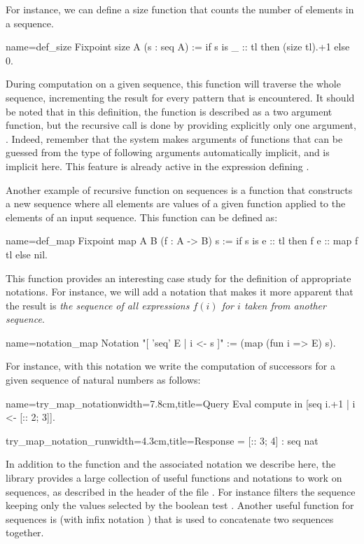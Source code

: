 For instance, we can define a size function that counts the number of
elements in a sequence.

\begin{coq}{name=def_size}{}
Fixpoint size A (s : seq A) :=
  if s is _ :: tl then (size tl).+1 else 0.
\end{coq}
During computation on a given sequence, this function will traverse
the whole sequence, incrementing the result for every
 pattern that is encountered.  It should be noted that in this
definition, the function  is described as a two argument
function, but the recursive call  is done by providing
explicitly only one argument, . Indeed, remember that
the \Coq{} system makes
arguments of functions that can be guessed from the type of following
arguments automatically implicit, and  is implicit here. This
feature is already active in the expression defining .

Another example of recursive function on sequences is a function that constructs
a new sequence where all elements are values of a given function applied to
the elements of an input sequence.  This function can be defined as:

\begin{coq}{name=def_map}{}
Fixpoint map A B (f : A -> B) s :=
  if s is e :: tl then f e :: map f tl else nil.
\end{coq}
This function provides an interesting case study for the definition of
appropriate notations. For instance, we will add a notation that
makes it more apparent that the result is {\em the sequence of all
expressions \(f(i)\) for \(i\) taken from another sequence}.

\begin{coq}{name=notation_map}{}
Notation "[ 'seq' E | i <- s ]" := (map (fun i => E) s).
\end{coq}
For instance, with this notation we write the computation of successors
for a given sequence of natural numbers as follows:

\begin{coq}{name=try_map_notation}{width=7.8cm,title=Query}
Eval compute in [seq i.+1 | i <- [:: 2; 3]].
\end{coq}
\begin{coqout}{try_map_notation_run}{width=4.3cm,title=Response}
= [:: 3; 4] : seq nat
\end{coqout}
\index[coq]{\C{[seq .. "| .. <- ..]}}
In addition to the function  and the associated notation
we describe here, the \mcbMC{} library
provides a large collection of useful functions and notations to work on
sequences, as described in the header of the file .  For
instance \C{[seq i <- s | p]} filters the sequence  keeping only
the values selected by the boolean test .
Another useful function for sequences is  (with infix notation \C{++})
that is used to concatenate two sequences together.
\index[coq]{\C{(_ ++ _)}}
\index[coq]{\C{[seq .. <- .. "| ..]}}

